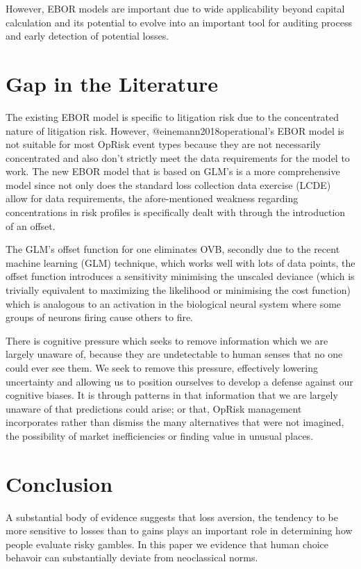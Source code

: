 \documentclass[]{article}
\begin{document}
However, EBOR models are important due to wide applicability beyond
capital calculation and its potential to evolve into an important tool
for auditing process and early detection of potential losses.

\section{Gap in the Literature}
\label{sec:Gap in the Literature}

The existing EBOR model is specific to litigation risk due to the
concentrated nature of litigation risk. However,
@einemann2018operational's EBOR model is not suitable for most OpRisk
event types because they are not necessarily concentrated and also don't
strictly meet the data requirements for the model to work. The new EBOR
model that is based on GLM's is a more comprehensive model since not
only does the standard loss collection data exercise (LCDE) allow for
data requirements, the afore-mentioned weakness regarding concentrations
in risk profiles is specifically dealt with through the introduction of
an offset.\medskip

The GLM's offset function for one eliminates OVB, secondly due to the
recent machine learning (GLM) technique, which works well with lots of
data points, the offset function introduces a sensitivity minimising the
unscaled deviance (which is trivially equivalent to maximizing the
likelihood or minimising the cost function) which is analogous to an
activation in the biological neural system where some groups of neurons
firing cause others to fire.

There is cognitive pressure which seeks to remove information which we
are largely unaware of, because they are undetectable to human senses
that no one could ever see them. We seek to remove this pressure,
effectively lowering uncertainty and allowing us to position ourselves
to develop a defense against our cognitive biases. It is through
patterns in that information that we are largely unaware of that
predictions could arise; or that, OpRisk management incorporates rather
than dismiss the many alternatives that were not imagined, the
possibility of market inefficiencies or finding value in unusual places.

\section{Conclusion}
\label{sec:Conclusion}

A substantial body of evidence suggests that loss aversion, the tendency
to be more sensitive to losses than to gains plays an important role in
determining how people evaluate risky gambles. In this paper we evidence
that human choice behavoir can substantially deviate from neoclassical
norms.\medskip
\end{document}
